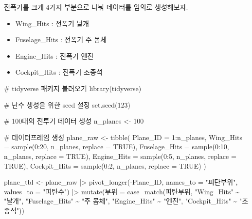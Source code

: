 \documentclass[
  letterpaper,
  chapter,a4paper,showtrims,openright,hidelinks]{oblivoir}
\newenvironment{Shaded}{\begin{snugshade}}{\end{snugshade}}
\newcommand{\AttributeTok}[1]{\textcolor[rgb]{0.40,0.45,0.13}{#1}}
\newcommand{\CommentTok}[1]{\textcolor[rgb]{0.37,0.37,0.37}{#1}}
\newcommand{\ConstantTok}[1]{\textcolor[rgb]{0.56,0.35,0.01}{#1}}
\newcommand{\DecValTok}[1]{\textcolor[rgb]{0.68,0.00,0.00}{#1}}
\newcommand{\FunctionTok}[1]{\textcolor[rgb]{0.28,0.35,0.67}{#1}}
\newcommand{\NormalTok}[1]{\textcolor[rgb]{0.00,0.23,0.31}{#1}}
\newcommand{\OtherTok}[1]{\textcolor[rgb]{0.00,0.23,0.31}{#1}}
\newcommand{\SpecialCharTok}[1]{\textcolor[rgb]{0.37,0.37,0.37}{#1}}
\newcommand{\StringTok}[1]{\textcolor[rgb]{0.13,0.47,0.30}{#1}}
\providecommand{\tightlist}{%
  \setlength{\itemsep}{0pt}\setlength{\parskip}{0pt}}\usepackage{longtable,booktabs,array}
\begin{document}
전폭기를 크게 4가지 부분으로 나눠 데이터를 임의로 생성해보자.

\begin{itemize}
\tightlist
\item
  Wing\_Hits : 전폭기 날개
\item
  Fuselage\_Hits : 전폭기 주 몸체
\item
  Engine\_Hits : 전폭기 엔진
\item
  Cockpit\_Hits : 전폭기 조종석
\end{itemize}

\begin{Shaded}
\begin{Highlighting}[]
\CommentTok{\# tidyverse 패키지 불러오기}
\FunctionTok{library}\NormalTok{(tidyverse)}

\CommentTok{\# 난수 생성을 위한 seed 설정}
\FunctionTok{set.seed}\NormalTok{(}\DecValTok{123}\NormalTok{)}

\CommentTok{\# 100대의 전투기 데이터 생성}
\NormalTok{n\_planes }\OtherTok{\textless{}{-}} \DecValTok{100}

\CommentTok{\# 데이터프레임 생성}
\NormalTok{plane\_raw }\OtherTok{\textless{}{-}} \FunctionTok{tibble}\NormalTok{(}
  \AttributeTok{Plane\_ID =} \DecValTok{1}\SpecialCharTok{:}\NormalTok{n\_planes,}
  \AttributeTok{Wing\_Hits =} \FunctionTok{sample}\NormalTok{(}\DecValTok{0}\SpecialCharTok{:}\DecValTok{20}\NormalTok{, n\_planes, }\AttributeTok{replace =} \ConstantTok{TRUE}\NormalTok{),}
  \AttributeTok{Fuselage\_Hits =} \FunctionTok{sample}\NormalTok{(}\DecValTok{0}\SpecialCharTok{:}\DecValTok{10}\NormalTok{, n\_planes, }\AttributeTok{replace =} \ConstantTok{TRUE}\NormalTok{),}
  \AttributeTok{Engine\_Hits =} \FunctionTok{sample}\NormalTok{(}\DecValTok{0}\SpecialCharTok{:}\DecValTok{5}\NormalTok{, n\_planes, }\AttributeTok{replace =} \ConstantTok{TRUE}\NormalTok{),}
  \AttributeTok{Cockpit\_Hits =} \FunctionTok{sample}\NormalTok{(}\DecValTok{0}\SpecialCharTok{:}\DecValTok{2}\NormalTok{, n\_planes, }\AttributeTok{replace =} \ConstantTok{TRUE}\NormalTok{)}
\NormalTok{) }
  
\NormalTok{plane\_tbl }\OtherTok{\textless{}{-}}\NormalTok{ plane\_raw }\SpecialCharTok{|\textgreater{}} 
  \FunctionTok{pivot\_longer}\NormalTok{(}\SpecialCharTok{{-}}\NormalTok{Plane\_ID, }\AttributeTok{names\_to =} \StringTok{"피탄부위"}\NormalTok{, }\AttributeTok{values\_to =} \StringTok{"피탄수"}\NormalTok{) }\SpecialCharTok{|\textgreater{}} 
  \FunctionTok{mutate}\NormalTok{(부위 }\OtherTok{=} \FunctionTok{case\_match}\NormalTok{(피탄부위,}
                         \StringTok{"Wing\_Hits"}     \SpecialCharTok{\textasciitilde{}} \StringTok{"날개"}\NormalTok{,}
                         \StringTok{"Fuselage\_Hits"} \SpecialCharTok{\textasciitilde{}} \StringTok{"주 몸체"}\NormalTok{,}
                         \StringTok{"Engine\_Hits"}   \SpecialCharTok{\textasciitilde{}} \StringTok{"엔진"}\NormalTok{,}
                         \StringTok{"Cockpit\_Hits"}  \SpecialCharTok{\textasciitilde{}} \StringTok{"조종석"}\NormalTok{))}


\end{Highlighting}
\end{Shaded}
\end{document}
